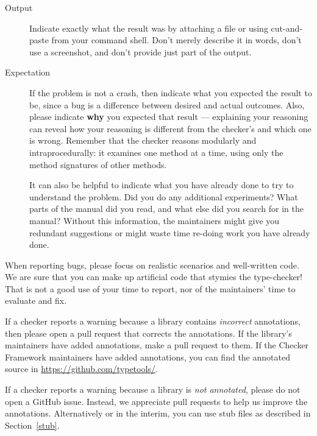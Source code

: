 \begin{description}
\item[Output]
  Indicate exactly what the result was by attaching a file or using
  cut-and-paste from your command shell.  Don't merely describe it in
  words, don't use a screenshot, and don't provide just part of the output.

\item[Expectation]
  If the problem is not a crash, then
  indicate what you expected the result to be, since a bug is a difference
  between desired and actual outcomes.  Also, please indicate \textbf{why}
  you expected that result --- explaining your reasoning can reveal
  how your reasoning is different from the checker's and which
  one is wrong.  Remember that the checker reasons modularly and
  intraprocedurally:  it examines one method at a time, using only the
  method signatures of other methods.

  It can also be helpful to indicate what you have already done to try to
  understand the problem.  Did you do any additional experiments?  What
  parts of the manual did you read, and what else did you search for in the
  manual?  Without this information, the maintainers might give you redundant
  suggestions or might waste time re-doing work you have already done.
\end{description}


When reporting bugs, please focus on realistic scenarios and well-written
code.  We are sure that you can make up artificial code that stymies the
type-checker!  That is not a good use of your time to report, nor of the
maintainers' time to evaluate and fix.



If a checker reports a warning because a library contains \emph{incorrect} annotations,
then please open a pull request that corrects the annotations.  If the
library's maintainers have added annotations, make a pull request to them.
If the Checker Framework maintainers have added annotations,
you can find the annotated source in \url{https://github.com/typetools/}.

If a checker reports a warning because a library is \emph{not
annotated}, please do not open a GitHub issue.
Instead, we appreciate pull requests to help us improve the annotations.
Alternatively or in the interim, you can use stub files as described in
Section~\ref{stub}.

